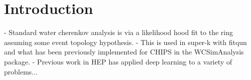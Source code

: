 \section{Introduction}
\label{sec:cvn_intro}
- Standard water cherenkov analysis is via a likelihood hood fit to the ring assuming some event topology hypothesis.
- This is used in super-k with fitqun and what has been previously implemented for CHIPS in the WCSimAnalysis package.
- Previous work in HEP has applied deep learning to a variety of problems...

